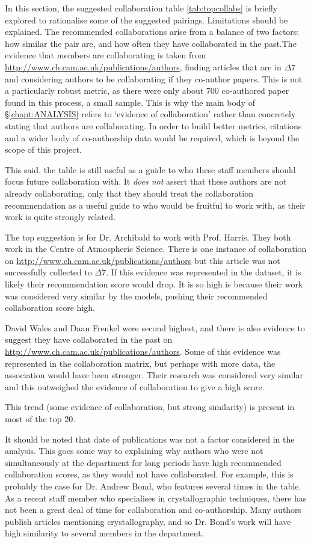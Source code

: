 \label{sec:collabtable}
In this section, the suggested collaboration table \ref{tab:topcollabs} is briefly explored to rationalise some of the suggested pairings.
Limitations should be explained. 
The recommended collaborations arise from a balance of two factors: how similar the pair are, and how often they have collaborated in the past.The evidence that members are collaborating is taken from \url{http://www.ch.cam.ac.uk/publications/authors}, finding articles that are in $\Delta7$ and considering authors to be collaborating if they co-author papers. This is not a particularly robust metric, as there were only about 700 co-authored paper found in this process, a small sample. This is why the main body of \S\ref{chapt:ANALYSIS} refers to `evidence of collaboration' rather than concretely stating that authors are collaborating. In order to build better metrics, citations and a wider body of co-authorship data would be required, which is beyond the scope of this project.

This said, the table is still useful as a guide to who these staff members should focus future collaboration with. It \emph{does not} assert that these authors are not already collaborating, only that they should treat the collaboration recommendation as a useful guide to who would be fruitful to work with, as their work is quite strongly related.

The top suggestion is for Dr. Archibald to work with Prof. Harris. They both work in the Centre of Atmospheric Science. There is one instance of collaboration on \url{http://www.ch.cam.ac.uk/publications/authors} but this article was not successfully collected to $\Delta7$. If this evidence was represented in the dataset, it is likely their recommendation score would drop. It is so high is because their work was considered very similar by the models, pushing their recommended collaboration score high.

David Wales and Daan Frenkel were second highest, and there is also evidence to suggest they have  collaborated in the past on \url{http://www.ch.cam.ac.uk/publications/authors}. Some of this evidence was represented in the collaboration matrix, but perhaps with more data, the association would have been stronger. Their research was considered very similar and this outweighed the evidence of collaboration to give a high score.

This trend (some evidence of collaboration, but strong similarity) is present in most of the top 20. 

It should be noted that date of publications was not a factor considered in the analysis. This goes some way to explaining why authors who were not simultaneously at the department for long periods have high recommended collaboration scores, as they would not have collaborated. For example, this is probably the case for Dr. Andrew Bond, who features several times in the table. As a recent staff member who specialises in crystallographic techniques, there has not been a great deal of time for collaboration and co-authorship. Many authors publish articles mentioning crystallography, and so Dr. Bond's work will have high similarity to several members in the department.
